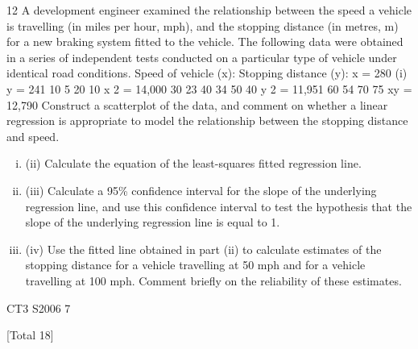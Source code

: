 \documentclass[a4paper,12pt]{article}
\begin{document}
\begin{enumerate}

12
A development engineer examined the relationship between the speed a vehicle is
travelling (in miles per hour, mph), and the stopping distance (in metres, m) for a new
braking system fitted to the vehicle. The following data were obtained in a series of
independent tests conducted on a particular type of vehicle under identical road
conditions.
Speed of vehicle (x):
Stopping distance (y):
x = 280
(i)
y = 241
10
5
20
10
x 2 = 14,000
30
23
40
34
50
40
y 2 = 11,951
60
54
70
75
xy = 12,790
Construct a scatterplot of the data, and comment on whether a linear
regression is appropriate to model the relationship between the stopping
distance and speed. 
\begin{enumerate}[(i)]
\item (ii) Calculate the equation of the least-squares fitted regression line. 
\item (iii) Calculate a 95\% confidence interval for the slope of the underlying regression
line, and use this confidence interval to test the hypothesis that the slope of the
underlying regression line is equal to 1.
\item 
(iv) Use the fitted line obtained in part (ii) to calculate estimates of the stopping
distance for a vehicle travelling at 50 mph and for a vehicle travelling at 100
mph.
Comment briefly on the reliability of these estimates.
\end{enumerate}

CT3 S2006
7

[Total 18]


\end{enumerate}
\end{document}
